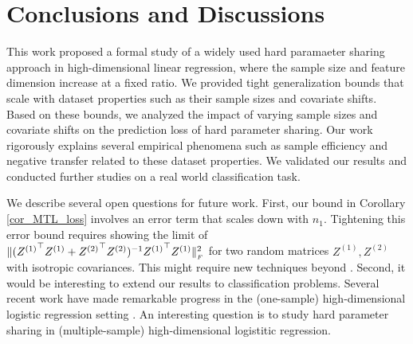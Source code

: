 \section{Conclusions and Discussions}\label{sec_conclude}

This work proposed a formal study of a widely used hard paramaeter sharing approach in high-dimensional linear regression, where the sample size and feature dimension increase at a fixed ratio.
We provided tight generalization bounds that scale with dataset properties such as their sample sizes and covariate shifts.
Based on these bounds, we analyzed the impact of varying sample sizes and covariate shifts on the prediction loss of hard parameter sharing.
Our work rigorously explains several empirical phenomena such as sample efficiency and negative transfer related to these dataset properties.
We validated our results and conducted further studies on a real world classification task.

We describe several open questions for future work.
First, our bound in Corollary \eqref{cor_MTL_loss} involves an error term that scales down with $n_1$.
Tightening this error bound requires showing the limit of $\|({Z^{(1)}}^{\top} Z^{(1)} + {Z^{(2)}}^{\top} Z^{(2)})^{-1} {Z^{(1)}}^{\top} Z^{(1)}\|_{_{F}}^2$ for two random matrices $Z^{(1)}, Z^{(2)}$ with isotropic covariances.
This might require new techniques beyond .
Second, it would be interesting to extend our results to classification problems.
Several recent work have made remarkable progress in the (one-sample) high-dimensional logistic regression setting \cite{sur2019modern}.
An interesting question is to study hard parameter sharing in (multiple-sample) high-dimensional logistitic regression.
